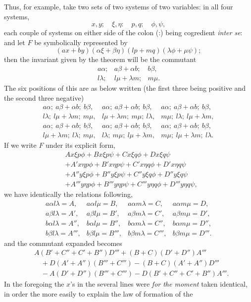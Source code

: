 \documentclass[11pt]{article}
\newcommand{\sourcepage}[1]{\marginpar{\scriptsize p.~#1}}
\begin{document}
\sourcepage{313}
Thus, for example, take two sets of two systems of two variables: in all four systems,
\[
x,y;\quad \xi,\eta:\quad p,q;\quad \phi,\psi,
\]
each couple of systems on either side of the colon (:) being cogredient \emph{inter se}: and let $F$ be symbolically represented by
\[
(ax+by)(\alpha\xi+\beta\eta)(lp+mq)(\lambda\phi+\mu\psi);
\]
then the invariant given by the theorem will be the commutant
\[
\begin{array}{ccc}
a\alpha;&a\beta+\alpha b;&b\beta,\\
l\lambda;&l\mu+\lambda m;&m\mu.
\end{array}
\]
The six positions of this are as below written (the first three being positive and the second three negative)
\[
\begin{array}{ccc}
a\alpha;\ a\beta+\alpha b;\ b\beta,&
a\alpha;\ a\beta+\alpha b;\ b\beta,&
a\alpha;\ a\beta+\alpha b;\ b\beta,\\
l\lambda;\ l\mu+\lambda m;\ m\mu,&
l\mu+\lambda m;\ m\mu;\ l\lambda,&
m\mu;\ l\lambda;\ l\mu+\lambda m,\\[0.4em]
a\alpha;\ a\beta+\alpha b;\ b\beta,&
a\alpha;\ a\beta+\alpha b;\ b\beta,&
a\alpha;\ a\beta+\alpha b;\ b\beta,\\
l\mu+\lambda m;\ l\lambda;\ m\mu,&
l\lambda;\ m\mu;\ l\mu+\lambda m,&
m\mu;\ l\mu+\lambda m;\ l\lambda.
\end{array}
\]
If we write $F$ under its explicit form,
\[
\begin{aligned}
&Ax\xi p\phi+Bx\xi p\psi+Cx\xi q\phi+Dx\xi q\psi\\
&+A'x\eta p\phi+B'x\eta p\psi+C'x\eta q\phi+D'x\eta q\psi\\
&+A''y\xi p\phi+B''y\xi p\psi+C''y\xi q\phi+D''y\xi q\psi\\
&+A'''y\eta p\phi+B'''y\eta p\psi+C'''y\eta q\phi+D'''y\eta q\psi,
\end{aligned}
\]
we have identically the relations following,
\[
\begin{array}{llll}
a\alpha l\lambda=A,&a\alpha l\mu=B,&a\alpha m\lambda=C,&a\alpha m\mu=D,\\
a\beta l\lambda=A',&a\beta l\mu=B',&a\beta m\lambda=C',&a\beta m\mu=D',\\
b\alpha l\lambda=A'',&b\alpha l\mu=B'',&b\alpha m\lambda=C'',&b\alpha m\mu=D'',\\
b\beta l\lambda=A''',&b\beta l\mu=B''',&b\beta m\lambda=C''',&b\beta m\mu=D'''.
\end{array}
\]
and the commutant expanded becomes
\[
\begin{aligned}
&A(B'+C''+C'+B'')D'''+(B+C)(D'+D'')A'''\\
&\quad+D(A'+A'')(B'''+C''')-(B+C)(A'+A'')D'''\\
&\quad-A(D'+D'')(B'''+C''')-D(B'+C''+C'+B'')A'''.
\end{aligned}
\]
In the foregoing the $x$'s in the several lines were \emph{for the moment} taken identical, in order the more easily to explain the law of formation of the
\end{document}
